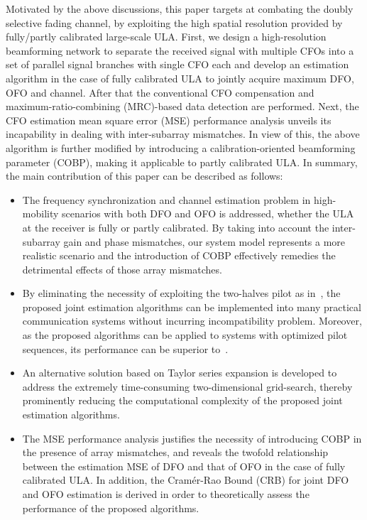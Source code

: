 \documentclass[12pt, draftclsnofoot, onecolumn]{IEEEtran}
\begin{document}
Motivated by the above discussions, this paper targets at combating the doubly selective fading channel, by exploiting the high spatial resolution provided by fully/partly calibrated large-scale ULA. First, we design a high-resolution beamforming network to separate the received signal with multiple CFOs into a set of parallel signal branches with single CFO each and develop an estimation algorithm in the case of fully calibrated ULA to jointly acquire maximum DFO, OFO and channel. After that the conventional CFO compensation and maximum-ratio-combining (MRC)-based data detection are performed. Next, the CFO estimation mean square error (MSE) performance analysis unveils its incapability in dealing with inter-subarray mismatches. In view of this, the above algorithm is further modified by introducing a calibration-oriented beamforming parameter (COBP), making it applicable to partly calibrated ULA.
In summary, the main contribution of this paper can be described as follows:
\begin{itemize}
  \item The frequency synchronization and channel estimation problem in high-mobility scenarios with both DFO and OFO is addressed, whether the ULA at the receiver is fully or partly calibrated. By taking into account the inter-subarray gain and phase mismatches, our system model represents a more realistic scenario and the introduction of COBP effectively remedies the detrimental effects of those array mismatches.
  \item By eliminating the necessity of exploiting the two-halves pilot as in~\cite{W_Guo2017TVT}, the proposed joint estimation algorithms can be implemented into many practical communication systems without incurring incompatibility problem.
      Moreover, as the proposed algorithms can be applied to systems with optimized pilot sequences, its performance can be superior to~\cite{W_Guo2017TVT}.
  \item An alternative solution based on Taylor series expansion is developed to address the extremely time-consuming two-dimensional grid-search, thereby prominently reducing the computational complexity of the proposed joint estimation algorithms.
  \item The MSE performance analysis justifies the necessity of introducing COBP in the presence of array mismatches, and reveals the twofold relationship between the estimation MSE of DFO and that of OFO in the case of fully calibrated ULA. In addition, the Cram\'{e}r-Rao Bound (CRB) for joint DFO and OFO estimation is derived in order to theoretically assess the performance of the proposed algorithms.
\end{itemize}
\end{document}
